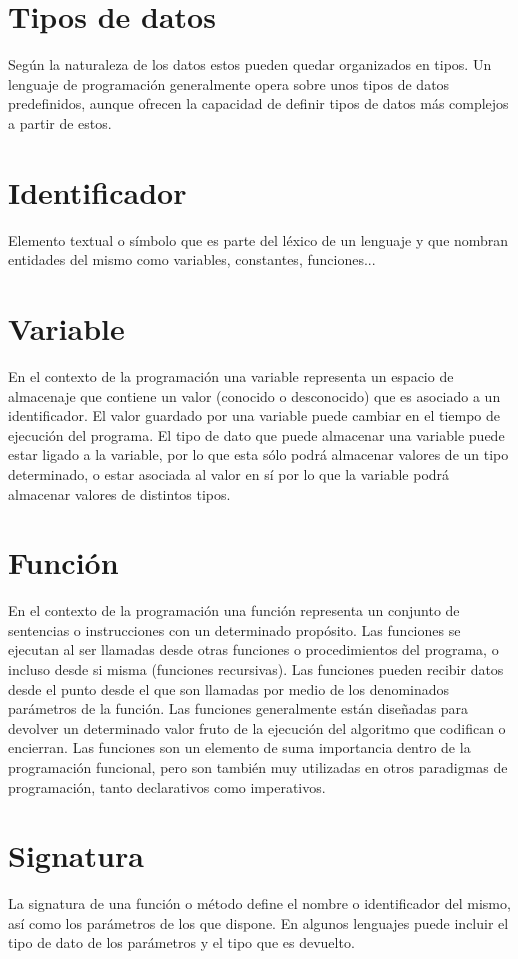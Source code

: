 \section{Tipos de datos}
Según la naturaleza de los datos estos pueden quedar organizados en tipos. Un lenguaje de programación generalmente opera sobre unos tipos de datos 
predefinidos, aunque ofrecen la capacidad de definir tipos de datos más complejos a partir de estos.

\section{Identificador}
Elemento textual o símbolo que es parte del léxico de un lenguaje y que nombran entidades del mismo como variables, constantes, funciones...

\section{Variable}
En el contexto de la programación una variable representa un espacio de almacenaje que contiene un valor (conocido o desconocido) que es asociado a un identificador.
El valor guardado por una variable puede cambiar en el tiempo de ejecución del programa. El tipo de dato que puede almacenar una variable puede estar ligado a la 
variable, por lo que esta sólo podrá almacenar valores de un tipo determinado, o estar asociada al valor en sí por lo que la variable podrá almacenar valores de 
distintos tipos.

\section{Función}
En el contexto de la programación una función representa un conjunto de sentencias o instrucciones con un determinado propósito. Las funciones se ejecutan al ser llamadas desde otras
funciones o procedimientos del programa, o incluso desde si misma (funciones recursivas). Las funciones pueden recibir datos desde el punto desde el que son llamadas por medio de los 
denominados parámetros de la función. Las funciones generalmente están diseñadas para devolver un determinado 
valor fruto de la ejecución del algoritmo que codifican o encierran. Las funciones son un elemento de suma importancia dentro de la programación funcional, pero son también muy utilizadas en otros paradigmas de programación, 
tanto declarativos como imperativos. 

\section {Signatura}
La signatura de una función o método define el nombre o identificador del mismo, así como los parámetros de los que dispone. En algunos lenguajes puede incluir el tipo de dato de los parámetros 
y el tipo que es devuelto.  

